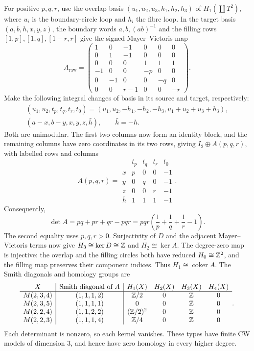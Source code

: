 For positive $p,q,r$, use the overlap basis $(u_1,u_2,u_3,h_1,h_2,h_3)$ of $H_1(\coprod T^2)$, where $u_i$ is the boundary-circle loop and $h_i$ the fibre loop. In the target basis $(a,b,h,x,y,z)$, the boundary words $a,b,(ab)^{-1}$ and the filling rows $[1,p],[1,q],[1-r,r]$ give the signed Mayer--Vietoris map
\[
A_{\mathrm{raw}}=
\begin{pmatrix}
1&0&-1&0&0&0\\
0&1&-1&0&0&0\\
0&0&0&1&1&1\\
-1&0&0&-p&0&0\\
0&-1&0&0&-q&0\\
0&0&r-1&0&0&-r
\end{pmatrix}.
\]
Make the following integral changes of basis in its source and target, respectively:
\[
\begin{gathered}
(u_1,u_2,t_p,t_q,t_r,t_0)
=(u_1,u_2,-h_1,-h_2,-h_3,u_1+u_2+u_3+h_3),\\
(a-x,b-y,x,y,z,\bar h),\qquad \bar h=-h.
\end{gathered}
\]
Both are unimodular. The first two columns now form an identity block, and the remaining columns have zero coordinates in its two rows, giving $I_2\oplus A(p,q,r)$, with labelled rows and columns
\[
A(p,q,r)=
\begin{array}{c|rrrr}
 &t_p&t_q&t_r&t_0\\\hline
x&p&0&0&-1\\
y&0&q&0&-1\\
z&0&0&r&-1\\
\bar h&1&1&1&-1
\end{array}.
\]
Consequently,
\[
\det A=pq+pr+qr-pqr
=pqr\left(\frac1p+\frac1q+\frac1r-1\right).
\]
The second equality uses $p,q,r>0$. Surjectivity of $D$ and the adjacent Mayer--Vietoris terms now give $H_3\cong\ker D\cong\mathbb Z$ and $H_2\cong\ker A$. The degree-zero map is injective: the overlap and the filling circles both have reduced $H_0\cong\mathbb Z^2$, and the filling map preserves their component indices. Thus $H_1\cong\operatorname{coker}A$. The Smith diagonals and homology groups are
\begin{equation}\label{eq:component-homology}
\begin{array}{c|c|cccc}
X&\text{Smith diagonal of }A&H_1(X)&H_2(X)&H_3(X)&H_4(X)\\\hline
M(2,3,4)&(1,1,1,2)&\mathbb Z/2&0&\mathbb Z&0\\
M(2,3,5)&(1,1,1,1)&0&0&\mathbb Z&0\\
M(2,2,4)&(1,1,2,2)&(\mathbb Z/2)^2&0&\mathbb Z&0\\
M(2,2,3)&(1,1,1,4)&\mathbb Z/4&0&\mathbb Z&0
\end{array}.
\end{equation}
Each determinant is nonzero, so each kernel vanishes. These types have finite CW models of dimension $3$, and hence have zero homology in every higher degree.

